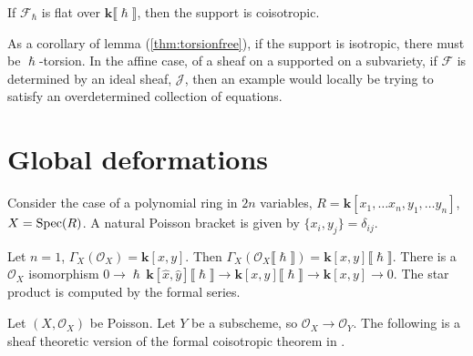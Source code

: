     \begin{lem} If \( \mathcal{F}_\hslash\) is flat over \( \mathbf{k}\lBrack \hslash \rBrack \), then the support is coisotropic.
    \end{lem}
    
    As a corollary of lemma (\ref{thm:torsionfree}), if the support is isotropic, there must be \(\hslash\)-torsion. In the affine case, of a sheaf on a supported on a subvariety, if \(\mathcal{F}\) is determined by an ideal sheaf, \(\mathcal{J}\), then an example would locally be trying to satisfy an overdetermined collection of equations. 
    

    \iffalse

    \section{Global deformations}
    
    Consider the case of a polynomial ring in \(2n\) variables, \(R = \mathbf{k}[x_1, \dots x_n, y_1, \dots y_n]\), \(X= \mathrm{Spec}(R)\). A natural Poisson bracket is given by \( \{x_i,y_j\} = \delta_{ij}\).
    \begin{ex}
    Let \(n=1\), \( \Gamma_X( \mathcal{O}_X) = \mathbf{k}[x,y]\). Then \(\Gamma_X (\mathcal{O}_X \lBrack \hslash \rBrack) = \mathbf{k}[x,y]\lBrack \hslash \rBrack \). There is a \(\mathcal{O}_X\) isomorphism  \(0 \rightarrow \hslash\, \mathbf{k}[\hat{x},\hat{y}]\lBrack \hslash \rBrack \rightarrow \mathbf{k}[x,y]\lBrack \hslash \rBrack  \rightarrow \mathbf{k}[x,y] \rightarrow 0\). The star product is computed by the formal series.
    \end{ex}
    

    Let \( (X,\mathcal{O}_X)\) be Poisson.
    Let \(Y\) be a subscheme, so \( \mathcal{O}_X \rightarrow \mathcal{O}_Y\). The following is a sheaf theoretic version of the formal coisotropic theorem in \cite{dasilva}.
    
    \begin{thm} 
 
    \end{thm}
    
